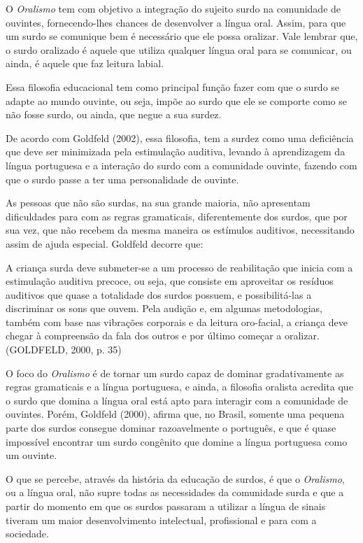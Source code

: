 \documentclass[brasil]{abnt}
\begin{document}
		 O \textit{Oralismo} tem com objetivo a integração do sujeito surdo na comunidade de ouvintes, fornecendo-lhes chances de desenvolver a língua oral. Assim, para que um surdo se comunique bem é 
		 necessário que ele possa oralizar. Vale lembrar que, o surdo oralizado é aquele que utiliza qualquer língua oral para se comunicar, ou ainda, é aquele que faz leitura labial.
		 
		 Essa filosofia educacional tem como principal função fazer com que o surdo se adapte ao mundo ouvinte, ou seja, impõe ao surdo que ele se comporte como se não fosse surdo, ou ainda, que negue a 
		 sua surdez.
		 
		 De acordo com Goldfeld (2002), essa filosofia, tem a surdez como uma deficiência que deve ser minimizada pela estimulação auditiva, levando à aprendizagem da língua portuguesa e a interação do surdo 
		 com a comunidade ouvinte, fazendo com que o surdo passe a ter uma personalidade de ouvinte.  
		 
		 As pessoas que não são surdas, na sua grande maioria, não apresentam dificuldades para com as regras gramaticais, diferentemente dos surdos, que por sua vez, que não recebem da mesma maneira os estímulos 
		 auditivos, necessitando assim de ajuda especial. Goldfeld decorre que:
		 
			\begin{citacao} A criança surda deve submeter-se a um processo de reabilitação que inicia com a estimulação auditiva precoce, ou seja, que consiste em aproveitar os resíduos auditivos que quase a 
							totalidade dos surdos possuem, e possibilitá-las a discriminar os sons que ouvem. Pela audição e, em algumas metodologias, também com base nas vibrações corporais e da leitura 
							oro-facial, a criança deve chegar à compreensão da fala dos outros e por último começar a oralizar. (GOLDFELD, 2000, p. 35) 
			\end{citacao}
		
		O foco do \textit{Oralismo} é de tornar um surdo capaz de dominar gradativamente as regras gramaticais e a língua portuguesa, e ainda, a filosofia oralista acredita que o surdo que domina a língua 
		oral está apto para interagir com a comunidade de ouvintes. Porém, Goldfeld (2000), afirma que, no Brasil, somente uma pequena parte dos surdos consegue dominar razoavelmente o português, e que é quase 
		impossível encontrar um surdo congênito que domine a língua portuguesa como um ouvinte.
		
		O que se percebe, através da história da educação de surdos, é que o \textit{Oralismo}, ou a língua oral, não supre todas as necessidades da comunidade surda e que a partir do momento em que os surdos 
		passaram a utilizar a língua de sinais tiveram um maior desenvolvimento intelectual, profissional e para com a sociedade.		 		 
		 
\end{document}
